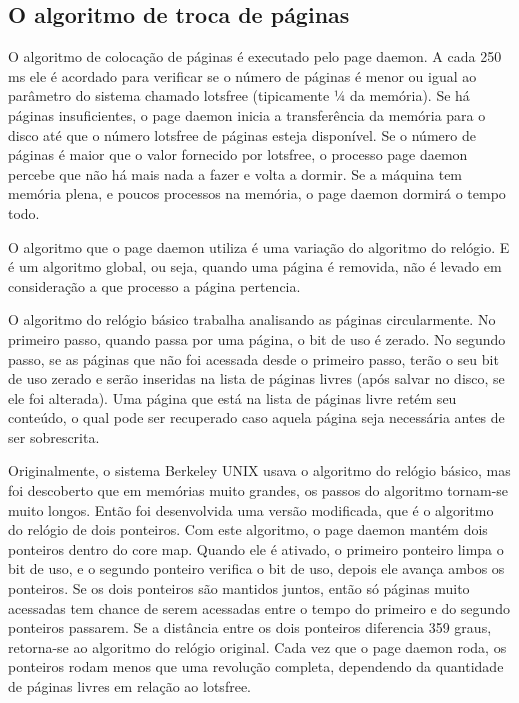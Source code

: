 \subsection{O algoritmo de troca de páginas}

O algoritmo de colocação de páginas é executado pelo page daemon. A cada 250 ms ele é acordado para verificar se o número de páginas é menor ou igual ao parâmetro do sistema chamado lotsfree (tipicamente ¼ da memória). Se há páginas insuficientes, o page daemon inicia a transferência da memória para o disco até que o número lotsfree de páginas esteja disponível. Se o número de páginas é maior que o valor fornecido por lotsfree, o processo page daemon percebe que não há mais nada a fazer e volta a dormir. Se a máquina tem memória plena, e poucos processos na memória, o page daemon dormirá o tempo todo.

O algoritmo que o page daemon utiliza é uma variação do algoritmo do relógio. E é um algoritmo global, ou seja, quando uma página é removida, não é levado em consideração a que processo a página pertencia.

O algoritmo do relógio básico trabalha analisando as páginas circularmente. No primeiro passo, quando passa por uma página, o bit de uso é zerado. No segundo passo, se as páginas que não foi acessada desde o primeiro passo, terão o seu bit de uso zerado e serão inseridas na lista de páginas livres (após salvar no disco, se ele foi alterada). Uma página que está na lista de páginas livre retém seu conteúdo, o qual pode ser recuperado caso aquela página seja necessária antes de ser sobrescrita.

Originalmente, o sistema Berkeley UNIX usava o algoritmo do relógio básico, mas foi descoberto que em memórias muito grandes, os passos do algoritmo tornam-se muito longos. Então foi desenvolvida uma versão modificada, que é o algoritmo do relógio de dois ponteiros. Com este algoritmo, o page daemon mantém dois ponteiros dentro do core map. Quando ele é ativado, o primeiro ponteiro limpa o bit de uso, e o segundo ponteiro verifica o bit de uso, depois ele avança ambos os ponteiros. Se os dois ponteiros são mantidos juntos, então só páginas muito acessadas tem chance de serem acessadas entre o tempo do primeiro e do segundo ponteiros passarem. Se a distância entre os dois ponteiros diferencia 359 graus, retorna-se ao algoritmo do relógio original. Cada vez que o page daemon roda, os ponteiros rodam menos que uma revolução completa, dependendo da quantidade de páginas livres em relação ao lotsfree.

